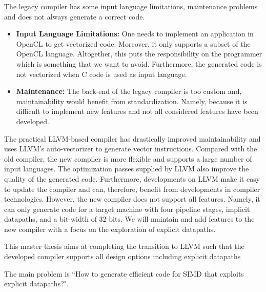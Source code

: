 The legacy compiler has some input language limitations, maintenance problems and 
does not always generate a correct code.
\begin{itemize}
\item \textbf{Input Language Limitations:} One needs to implement an application in OpenCL to get vectorized code. Moreover, it only supports a subset of the OpenCL language. Altogether, this puts the responsibility on the programmer which is something that we want to avoid. Furthermore, the generated code is not vectorized when C code is used as input language. 
\item \textbf{Maintenance:} The back-end of the legacy compiler is too custom and, maintainability would benefit from standardization. Namely, because it is difficult to implement new features and not all considered features have been developed.   
\end{itemize}

The practical LLVM-based compiler has drastically improved maintainability and uses LLVM's auto-vectorizer to generate vector instructions. Compared with the old compiler, the new compiler is more flexible and supports a large number of input languages. The optimization passes supplied by LLVM also improve the quality of the generated code. Furthermore, developments on LLVM make it easy to update the compiler and can, therefore, benefit from developments in compiler technologies. However, the new compiler does not support all features. Namely, it can only generate code for a target machine with four pipeline stages, implicit datapaths, and a bit-width of 32 bits. We will maintain and add features to the new compiler with a focus on the exploration of explicit datapaths.

This master thesis aims at completing the transition to LLVM such that the developed compiler supports all design options including explicit datapaths

The main problem is ``How to generate efficient code for SIMD that exploits explicit datapaths?". 


